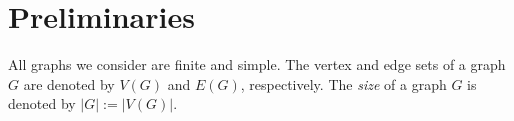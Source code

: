 \documentclass[kpfonts]{patmorin}
\newcommand{\pnote}[1]{\ \newline\noindent\fcolorbox{red}{yellow}{\begin{minipage}{\textwidth}#1\end{minipage}}}
\DeclareMathOperator{\A}{\mathds{A}}
\begin{document}
%
%
%


%



\section{Preliminaries}

All graphs we consider are finite and simple.  The vertex and edge sets of a graph $G$ are denoted by $V(G)$ and $E(G)$, respectively.  The \emph{size} of a graph $G$ is denoted by $|G|:=|V(G)|$.
\end{document}

